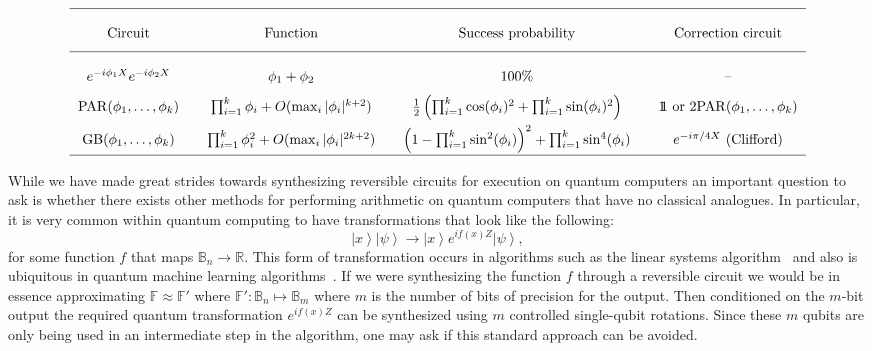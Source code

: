 \documentclass[conference]{IEEEtran}
\newcommand{\fig}[1]{\hyperref[fig:#1]{Figure~\ref*{fig:#1}}}
\newcommand{\openone}{1\!\!1}
\newcommand{\ket}[1]{\left| #1\right\rangle}        %
\begin{document}
\begin{table*}[t!]
\tiny
\[
\begin{tabular}{c@{\qquad}c@{\qquad}c@{\qquad}c}
\hline\\
Circuit & Function & Success probability& Correction circuit\\[1.5ex]
\hline\\
$e^{-i\phi_1 X} e^{-i\phi_2X}$ & $\phi_1+\phi_2$ & $100\%$& --\\[1.5ex]
${\rm PAR}(\phi_1,\ldots,\phi_k)$ & $\prod_{i=1}^k \phi_i + O(\max_i |\phi_i|^{k+2})$&
$\frac{1}{2}\left(\prod_{i=1}^k \cos(\phi_i)^2 + \prod_{i=1}^k \sin(\phi_i)^2\right)$ & $\openone\text{ or } 2{\rm PAR}(\phi_1,\ldots,\phi_k)$\\[1.5ex]
${\rm GB}(\phi_1,\ldots,\phi_k)$ & $\prod_{i=1}^k \phi^2_i + O(\max_i |\phi_i|^{2k+2})$&
$\left(1-\prod_{i=1}^k \sin^2(\phi_i)\right)^2 + \prod_{i=1}^k \sin^4(\phi_i)$ &
$e^{-i\pi/4 X}$ (Clifford)\\[1ex]
\hline
\end{tabular}
\]
\caption{Effective transformations carried out by the circuits in \fig{circuit} for small input rotations.\label{tab:succprob}}
\end{table*}
While we have made great strides towards synthesizing reversible circuits for execution on quantum computers an important question to ask is whether there exists other
methods for performing arithmetic on quantum computers that have no classical analogues.  In particular, it is very common within quantum computing to have transformations
that look like the following:
\begin{equation}
\ket{x}\ket{\psi} \rightarrow \ket{x}e^{if(x)Z}\ket{\psi},\label{eq:target}
\end{equation}
for some function $f$ that maps $\mathbb{B}_{n} \rightarrow \mathbb{R}$.  This form of transformation occurs in algorithms such as the linear systems algorithm~\cite{harrow2009quantum} and also is ubiquitous in quantum machine learning algorithms~\cite{lloyd2016quantum,wiebe2016quantum}.  If we were synthesizing the function $f$  through a reversible circuit we would be in essence approximating $\mathbb{F} \approx \mathbb{F}'$ where $\mathbb{F}' : \mathbb{B}_n \mapsto \mathbb{B}_m$ where $m$ is the number of bits of precision for the output.  Then conditioned on the $m$-bit output the required quantum transformation $e^{i f(x)Z}$ can be synthesized using $m$ controlled single-qubit rotations.  Since these $m$ qubits are only being used in an intermediate step in the algorithm, one may ask if this standard approach can be avoided.
\end{document}
